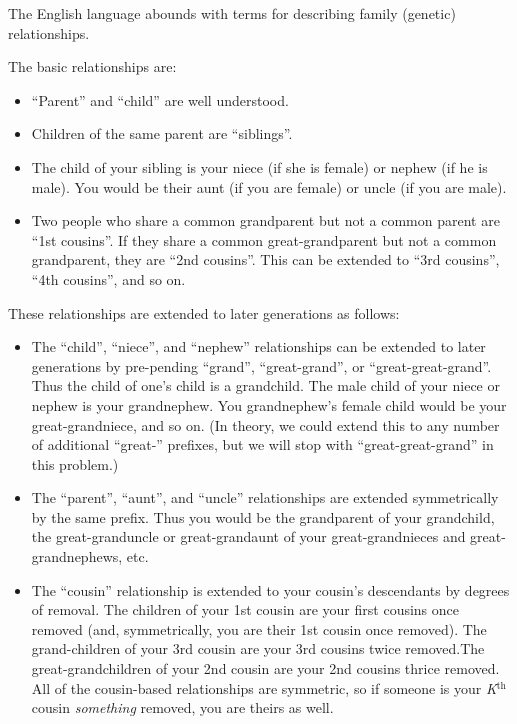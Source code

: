 


The English language abounds with terms for describing family
(genetic) relationships.

The basic relationships are:

\begin{itemize}
\item ``Parent'' and ``child'' are well understood.

\item Children of the same parent are ``siblings''.

\item The child of your sibling is your niece (if she is female) or
  nephew (if he is male). You would be their aunt (if you are female)
  or uncle (if you are male).

\item Two people who share a common grandparent but not a common
  parent are ``1st cousins''.  If they share a common
  great-grandparent but not a common grandparent, they are ``2nd
  cousins''. This can be extended to ``3rd cousins'', ``4th cousins'',
  and so on.
\end{itemize}

These relationships are extended to later generations as follows:

\begin{itemize}

\item The ``child'', ``niece'', and ``nephew'' relationships can be extended
  to later generations by pre-pending ``grand'', ``great-grand'', or
  ``great-great-grand''.  Thus the child of one's child is a
  grandchild. The male child of your niece or nephew is your
  grandnephew. You grandnephew's female child would be your
  great-grandniece, and so on. (In theory, we could extend this to any
  number of additional ``great-'' prefixes, but we will stop with
  ``great-great-grand'' in this problem.)

\item The ``parent'', ``aunt'', and ``uncle'' relationships are extended
  symmetrically by the same prefix. Thus you would be the grandparent
  of your grandchild, the great-granduncle or great-grandaunt of your
  great-grandnieces and great-grandnephews, etc.

\item The ``cousin'' relationship is extended to your cousin's descendants
  by degrees of removal. The children of your 1st cousin are your
  first cousins once removed (and, symmetrically, you are their 1st
  cousin once removed).  The grand-children of your 3rd cousin are
  your 3rd cousins twice removed.The great-grandchildren of your 2nd
  cousin are your 2nd cousins thrice removed. All of the cousin-based
  relationships are symmetric, so if someone is your
  \textit{K}$^{\mbox{th}}$ cousin \textit{something} removed, you are
  theirs as well.
\end{itemize}

